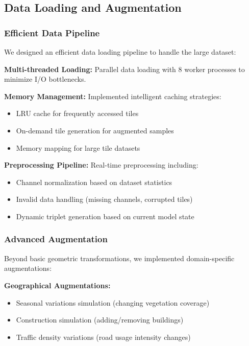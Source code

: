 \subsection{Data Loading and Augmentation}

\subsubsection{Efficient Data Pipeline}

We designed an efficient data loading pipeline to handle the large dataset:

\textbf{Multi-threaded Loading:} Parallel data loading with 8 worker processes to minimize I/O bottlenecks.

\textbf{Memory Management:} Implemented intelligent caching strategies:
\begin{itemize}
    \item LRU cache for frequently accessed tiles
    \item On-demand tile generation for augmented samples
    \item Memory mapping for large tile datasets
\end{itemize}

\textbf{Preprocessing Pipeline:} Real-time preprocessing including:
\begin{itemize}
    \item Channel normalization based on dataset statistics
    \item Invalid data handling (missing channels, corrupted tiles)
    \item Dynamic triplet generation based on current model state
\end{itemize}

\subsubsection{Advanced Augmentation}

Beyond basic geometric transformations, we implemented domain-specific augmentations:

\textbf{Geographical Augmentations:}
\begin{itemize}
    \item Seasonal variations simulation (changing vegetation coverage)
    \item Construction simulation (adding/removing buildings)
    \item Traffic density variations (road usage intensity changes)
\end{itemize}

